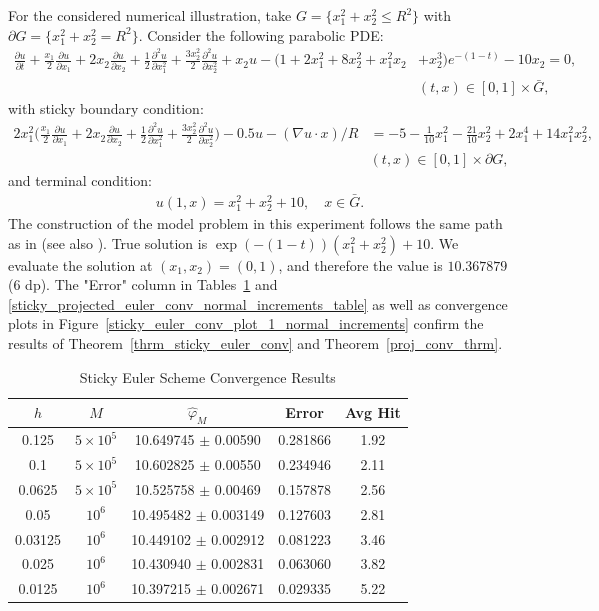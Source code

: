 \documentclass{article}
\theoremstyle{definition}
\numberwithin{equation}{section}
\begin{document}
For the considered numerical illustration, take $G = \{x_1 ^2 + x_2^2 \leq R^2\}$ with $\partial G = \{ x_1^2 + x_2^2 = R^2 \}$. Consider the following parabolic PDE:
\begin{align}
    \frac{\partial u}{\partial t} + \frac{x_1}{2} \frac{\partial u}{\partial x_1} + 2x_2\frac{\partial u}{\partial x_2} + \frac{1}{2}\frac{\partial^2 u}{\partial x_1^2 } + \frac{3 x_2^2}{2}\frac{\partial^2 u}{\partial x_2^2 }  + x_2 u - (1  + 2x_1^2 + 8x_2^2 + x_1^2 x_2 &+ x_2^3)e^{-(1-t)} - 10x_2 = 0, \nonumber \\  & (t,x) \in [0,1]\times \bar{G},  \nonumber
\end{align}
with sticky boundary condition:
\begin{align}
   2x_1^2 \bigg(\frac{x_1}{2} \frac{\partial u}{\partial x_1} + 2x_2\frac{\partial u}{\partial x_2} + \frac{1}{2}\frac{\partial^2 u}{\partial x_1^2 } + \frac{3 x_2^2}{2}\frac{\partial^2 u}{\partial x_2^2 } \bigg) - 0.5 u - (\nabla u \cdot x)/R & =  -5 - \frac{1}{10}x_1^2 - \frac{21}{10}x_2^2 + 2x_1^4 + 14x_1^2 x_2^2, \nonumber   \\ &   (t,x) \in [0,1]\times \partial G, \nonumber 
\end{align}
and terminal condition:
\begin{align*}
    u(1,x) = x_1^2 + x_2^2 + 10, \quad x \in \bar{G}. 
\end{align*}
The construction of the model problem in this experiment follows the same path as
in \cite{milstein2003simplest_dirichlet} (see also \cite{mil_tretyakov_book}). 
True solution is $\exp(-(1-t))(x_1^2 + x_2^2 )  + 10$. We evaluate the solution at  $(x_1, x_2) = (0,1)$, and therefore the   value is $10.367879 $ (6 dp). The "Error" column in Tables~\ref{sticky_euler_conv_normal_increments_table} and \ref{sticky_projected_euler_conv_normal_increments_table} as well as convergence plots in Figure~\ref{sticky_euler_conv_plot_1_normal_increments} confirm the results of Theorem~\ref{thrm_sticky_euler_conv} and Theorem~\ref{proj_conv_thrm}. 

\begin{table}[htbp]
\centering
\caption{Sticky Euler Scheme Convergence Results}
\label{sticky_euler_conv_normal_increments_table}
\begin{tabular}{c|c|c|c|c}
$h$ & $M$ &$\hat{\varphi}_{M}$ & Error & Avg Hit  \\
\hline
0.125 &  $5 \times 10^5$  & 10.649745 $\pm$ 0.00590 & 0.281866 & 1.92  \\
\hline
0.1 & $5 \times 10^5$ & 10.602825 $\pm$ 0.00550 & 0.234946 & 2.11  \\
\hline
0.0625 &  $5 \times 10^5$ & 10.525758 $\pm$ 0.00469 & 0.157878 & 2.56  \\
\hline
0.05 & $10^6$  & 10.495482 $\pm$ 0.003149  &  0.127603  & 2.81  \\
\hline
0.03125 & $10^6$ & 10.449102 $\pm$ 0.002912 & 0.081223  & 3.46  \\
\hline
0.025 & $10^6$ & 10.430940 $\pm$ 0.002831 & 0.063060   & 3.82  \\
\hline
0.0125 & $10^6$ & 10.397215 $\pm$ 0.002671  &  0.029335   & 5.22  \\
\end{tabular}
\end{table}
\end{document}
